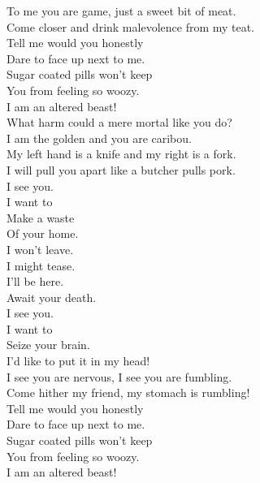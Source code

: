 To me you are game, just a sweet bit of meat. \\
Come closer and drink malevolence from my teat. \\

Tell me would you honestly \\
Dare to face up next to me. \\
Sugar coated pills won't keep \\
You from feeling so woozy. \\

I am an altered beast! \\

What harm could a mere mortal like you do? \\
I am the golden  and you are caribou. \\

My left hand is a knife and my right is a fork. \\
I will pull you apart like a butcher pulls pork. \\

I see you. \\
I want to \\
Make a waste \\
Of your home. \\

I won't leave. \\
I might tease. \\
I'll be here. \\
Await your death. \\

I see you. \\
I want to \\
Seize your brain. \\
I'd like to put it in my head! \\

I see you are nervous, I see you are fumbling. \\
Come hither my friend, my stomach is rumbling! \\

Tell me would you honestly \\
Dare to face up next to me. \\
Sugar coated pills won't keep \\
You from feeling so woozy. \\

I am an altered beast! \\



